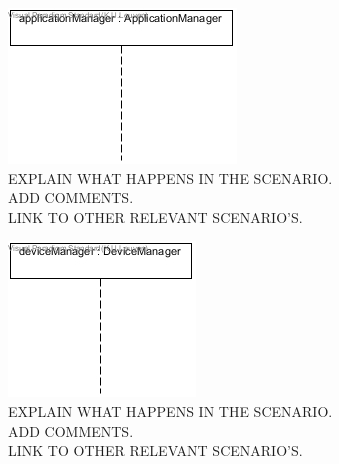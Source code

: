     \begin{figure}[!htp]
    	\centering
    	\includegraphics[width=\textwidth]{images/sequence-UC12}
    	\caption[Applications issuing actuation commands]{EXPLAIN WHAT HAPPENS IN THE SCENARIO. \\ ADD COMMENTS. \\ LINK TO OTHER RELEVANT SCENARIO'S. }\label{fig:seq_scenario3}
    \end{figure}

    \begin{figure}[!htp]
    	\centering
    	\includegraphics[width=\textwidth]{images/sequence-Av3-UC14-UC18}
    	\caption[Scenario ]{EXPLAIN WHAT HAPPENS IN THE SCENARIO. \\ ADD COMMENTS. \\ LINK TO OTHER RELEVANT SCENARIO'S. }\label{fig:seq_scenario4}
    \end{figure}

